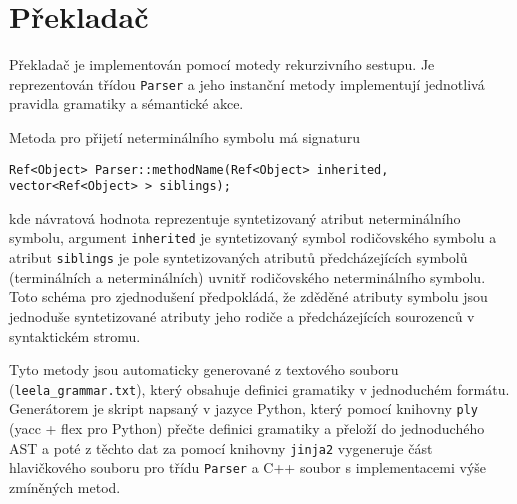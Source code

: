 \documentclass[10pt,a4paper]{article}
\begin{document}
\section{Překladač}
\label{sec:prekladac}

Překladač je implementován pomocí motedy rekurzivního sestupu. Je reprezentován
třídou \texttt{Parser} a jeho instanční metody implementují jednotlivá pravidla
gramatiky a sémantické akce.

Metoda pro přijetí neterminálního symbolu má signaturu
\begin{lstlisting}
Ref<Object> Parser::methodName(Ref<Object> inherited, vector<Ref<Object> > siblings);
\end{lstlisting}
kde návratová hodnota reprezentuje syntetizovaný atribut neterminálního
symbolu, argument \texttt{inherited} je syntetizovaný symbol rodičovského symbolu
a atribut \texttt{siblings} je pole syntetizovaných atributů předcházejících
symbolů (terminálních a neterminálních) uvnitř rodičovského neterminálního
symbolu. Toto schéma pro zjednodušení předpokládá, že zděděné atributy symbolu
jsou jednoduše syntetizované atributy jeho rodiče a předcházejících sourozenců
v syntaktickém stromu.

Tyto metody jsou automaticky generované z textového souboru
(\verb"leela_grammar.txt"), který obsahuje definici gramatiky v jednoduchém
formátu. Generátorem je skript napsaný v jazyce Python, který pomocí knihovny
\texttt{ply} (yacc + flex pro Python) přečte definici gramatiky a přeloží do
jednoduchého AST a poté z těchto dat za pomocí knihovny \texttt{jinja2}
vygeneruje část hlavičkového souboru pro třídu \texttt{Parser} a C++ soubor s
implementacemi výše zmíněných metod.
\end{document}
